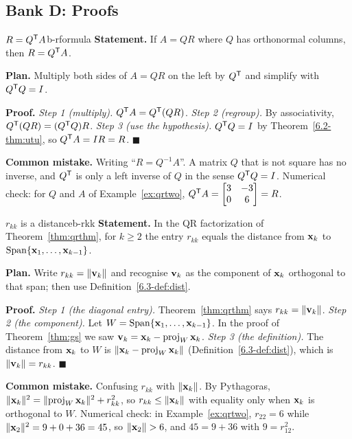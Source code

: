 \documentclass[11pt]{article}
\begin{document}
\subsection*{Bank D: Proofs}
\begin{exmp}{$R=Q^{\mathsf T} A$}{b-rformula}
\textbf{Statement.} If $A=QR$ where $Q$ has orthonormal columns, then $R=Q^{\mathsf T} A$.

\textbf{Plan.} Multiply both sides of $A=QR$ on the left by $Q^{\mathsf T}$ and simplify with $Q^{\mathsf T} Q=I$.

\textbf{Proof.}
\emph{Step 1 (multiply).} $Q^{\mathsf T} A=Q^{\mathsf T}(QR)$.
\emph{Step 2 (regroup).} By associativity, $Q^{\mathsf T}(QR)=(Q^{\mathsf T} Q)R$.
\emph{Step 3 (use the hypothesis).} $Q^{\mathsf T} Q=I$ by Theorem~\ref{6.2-thm:utu}, so $Q^{\mathsf T} A=IR=R$. \qquad$\blacksquare$

\textbf{Common mistake.} Writing ``$R=Q^{-1}A$''. A matrix $Q$ that is not square has no inverse, and $Q^{\mathsf T}$ is only a left inverse of $Q$ in the sense $Q^{\mathsf T} Q=I$. Numerical check: for $Q$ and $A$ of Example~\ref{ex:qrtwo}, $Q^{\mathsf T} A=\begin{bmatrix}3&-3\\0&6\end{bmatrix}=R$.
\end{exmp}

\begin{exmp}{$r_{kk}$ is a distance}{b-rkk}
\textbf{Statement.} In the QR factorization of Theorem~\ref{thm:qrthm}, for $k\ge2$ the entry $r_{kk}$ equals the distance from $\mathbf{x}_k$ to $\operatorname{Span}\{\mathbf{x}_1,\dots,\mathbf{x}_{k-1}\}$.

\textbf{Plan.} Write $r_{kk}=\lVert\mathbf{v}_k\rVert$ and recognise $\mathbf{v}_k$ as the component of $\mathbf{x}_k$ orthogonal to that span; then use Definition~\ref{6.3-def:dist}.

\textbf{Proof.}
\emph{Step 1 (the diagonal entry).} Theorem~\ref{thm:qrthm} says $r_{kk}=\lVert\mathbf{v}_k\rVert$.
\emph{Step 2 (the component).} Let $W=\operatorname{Span}\{\mathbf{x}_1,\dots,\mathbf{x}_{k-1}\}$. In the proof of Theorem~\ref{thm:gs} we saw $\mathbf{v}_k=\mathbf{x}_k-\operatorname{proj}_W\mathbf{x}_k$.
\emph{Step 3 (the definition).} The distance from $\mathbf{x}_k$ to $W$ is $\lVert\mathbf{x}_k-\operatorname{proj}_W\mathbf{x}_k\rVert$ (Definition~\ref{6.3-def:dist}), which is $\lVert\mathbf{v}_k\rVert=r_{kk}$. \qquad$\blacksquare$

\textbf{Common mistake.} Confusing $r_{kk}$ with $\lVert\mathbf{x}_k\rVert$. By Pythagoras, $\lVert\mathbf{x}_k\rVert^2=\lVert\operatorname{proj}_W\mathbf{x}_k\rVert^2+r_{kk}^2$, so $r_{kk}\le\lVert\mathbf{x}_k\rVert$ with equality only when $\mathbf{x}_k$ is orthogonal to $W$. Numerical check: in Example~\ref{ex:qrtwo}, $r_{22}=6$ while $\lVert\mathbf{x}_2\rVert^2=9+0+36=45$, so $\lVert\mathbf{x}_2\rVert>6$, and $45=9+36$ with $9=r_{12}^2$.
\end{exmp}
\end{document}
